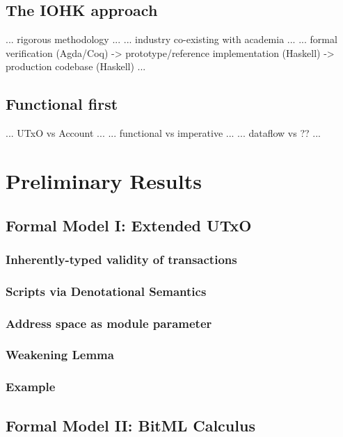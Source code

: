 \documentclass[acmsmall,nonacm=true,screen=true]{acmart}
\begin{document}
\subsection{The IOHK approach}

... rigorous methodology ...
... industry co-existing with academia ...
... formal verification (Agda/Coq) -> prototype/reference implementation (Haskell) -> production codebase (Haskell) ...

\subsection{Functional first}

... UTxO vs Account ...
... functional vs imperative ...
... dataflow vs ?? ...

\newpage
\section{Preliminary Results}
\label{sec:results}

\subsection{Formal Model I: Extended UTxO} \label{subsec:eutxo}
\subsubsection{Inherently-typed validity of transactions}
\subsubsection{Scripts via Denotational Semantics}
\subsubsection{Address space as module parameter}
\subsubsection{Weakening Lemma}
\subsubsection{Example}

\subsection{Formal Model II: BitML Calculus} \label{subsec:bitml}
\end{document}
